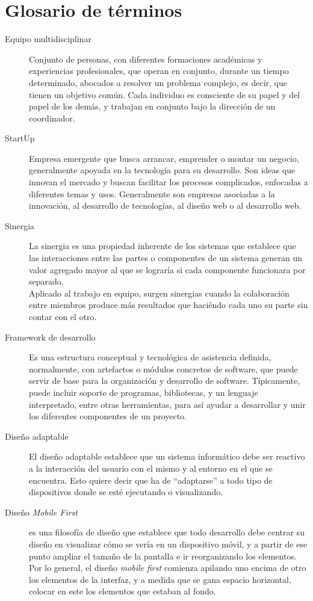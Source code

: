 \chapter{Glosario de términos}

\begin{description}
    \item[Equipo multidisciplinar] Conjunto de personas, con diferentes formaciones académicas y experiencias profesionales, que operan en conjunto, durante un tiempo determinado, abocados a resolver un problema complejo, es decir, que tienen un objetivo común. Cada individuo es consciente de su papel y del papel de los demás, y trabajan en conjunto bajo la dirección de un coordinador.
    \item[StartUp] Empresa emergente que busca arrancar, emprender o montar un negocio, generalmente apoyada en la tecnología para su desarrollo. Son ideas que innovan el mercado y buscan facilitar los procesos complicados, enfocadas a diferentes temas y usos. Generalmente son empresas asociadas a la innovación, al desarrollo de tecnologías, al diseño web o al desarrollo web.
    \item[Sinergia] La sinergia es una propiedad inherente de los sistemas que establece que las interacciones entre las partes o componentes de un sistema generan un valor agregado mayor al que se lograría si cada componente funcionara por separado.\\
    Aplicado al trabajo en equipo, surgen sinergias cuando la colaboración entre miembros produce más resultados que haciéndo cada uno su parte sin contar con el otro.
    \item[Framework de desarrollo] Es una estructura conceptual y tecnológica de asistencia definida, normalmente, con artefactos o módulos concretos de software, que puede servir de base para la organización y desarrollo de software. Típicamente, puede incluir soporte de programas, bibliotecas, y un lenguaje interpretado, entre otras herramientas, para así ayudar a desarrollar y unir los diferentes componentes de un proyecto.
    \item[Diseño adaptable] El diseño adaptable establece que un sistema informático debe ser reactivo a la interacción del usuario con el mismo y al entorno en el que se encuentra. Esto quiere decir que ha de ``adaptarse'' a todo tipo de dispositivos donde se esté ejecutando o visualizando.
    \item[Diseño \textit{Mobile First}] es una filosofía de diseño que establece que todo desarrollo debe centrar su diseño en visualizar cómo se vería en un dispositivo móvil, y a partir de ese punto ampliar el tamaño de la pantalla e ir reorganizando los elementos.\\
    Por lo general, el diseño \textit{mobile first} comienza apilando uno encima de otro los elementos de la interfaz, y a medida que se gana espacio horizontal, colocar en este los elementos que estaban al fondo.
\end{description}
